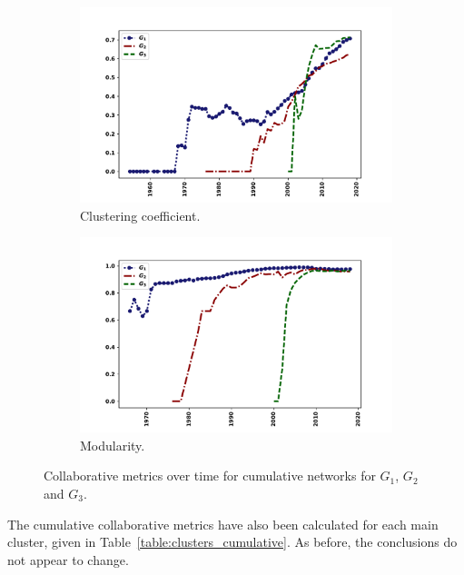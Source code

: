 \documentclass{article}
\theoremstyle{definition}
\begin{document}
\begin{figure}[!hbtp]
    \begin{subfigure}{.45\textwidth}\centering
        \includegraphics[width=1.1\textwidth]{./assets/images/clustering_coeff_over_time.pdf}
        \caption{Clustering coefficient.}\label{fig:clustering_coefficient}
     \end{subfigure}
     \begin{subfigure}{.45\textwidth}\centering
        \includegraphics[width=1.1\textwidth]{./assets/images/modularity_over_time.pdf}
        \caption{Modularity.}\label{fig:modularity}
     \end{subfigure}
    \caption{Collaborative metrics over time for cumulative networks for \(G_1\),
    \(G_2\) and \(G_3\).}\label{fig:cumulative_networks}
\end{figure}

The cumulative collaborative metrics have also been calculated for each main
cluster, given in Table~\ref{table:clusters_cumulative}. As before,
the conclusions do not appear to change.
\end{document}
